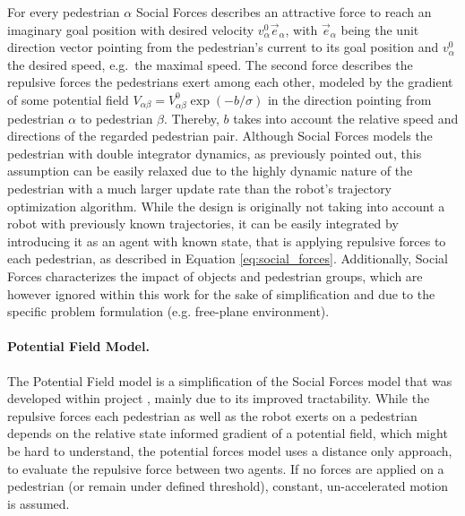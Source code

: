 For every pedestrian $\alpha$ Social Forces describes an attractive force to reach an imaginary goal position with desired velocity $v^0_{\alpha} \vec{e}_{\alpha}$, with $\vec{e}_{\alpha}$ being the unit direction vector pointing from the pedestrian's current to its goal position and $v^0_{\alpha}$ the desired speed, e.g.\ the maximal speed. The second force describes the repulsive forces the pedestrians exert among each other, modeled by the gradient of some potential field $V_{\alpha \beta} = V_{\alpha \beta}^0 \exp(-b / \sigma)$ in the direction pointing from pedestrian $\alpha$ to pedestrian $\beta$. Thereby, $b$ takes into account the relative speed and directions of the regarded pedestrian pair. Although Social Forces models the pedestrian with double integrator dynamics, as previously pointed out, this assumption can be easily relaxed due to the highly dynamic nature of the pedestrian with a much larger update rate than the robot's trajectory optimization algorithm.  While the design is originally not taking into account a robot with previously known trajectories, it can be easily integrated by introducing it as an agent with known state, that is applying repulsive forces to each pedestrian, as described in Equation \ref{eq:social_forces}. Additionally, Social Forces characterizes the impact of objects and pedestrian groups, which are however ignored within this work for the sake of simplification and due to the specific problem formulation (e.g. free-plane environment).
 
 \paragraph{Potential Field Model.} The Potential Field model is a simplification of the Social Forces model that was developed within project \project, mainly due to its improved tractability. While the repulsive forces each pedestrian as well as the robot exerts on a pedestrian depends on the relative state informed gradient of a potential field, which might be hard to understand, the potential forces model uses a distance only approach, to evaluate the repulsive force between two agents. If no forces are applied on a pedestrian (or remain under defined threshold), constant, un-accelerated motion is assumed.
 